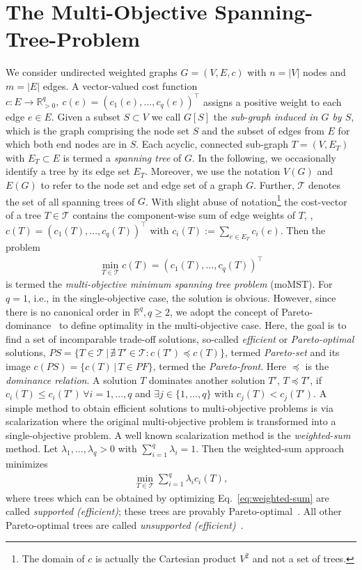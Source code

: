\documentclass[twoside]{article}
\begin{document}
\section{The Multi-Objective Spanning-Tree-Problem}
\label{sec:problem}
%
We consider undirected weighted graphs $G = (V, E, c)$ with $n = |V|$ nodes and $m = |E|$ edges. A vector-valued cost function $c : E \to \mathbb{R}^q_{>0}, \ c(e) = (c_1(e), \ldots, c_q(e))^{\top}$ assigns a positive weight to each edge $e \in E$. Given a subset $S \subset V$ we call $G[S]$ the \emph{sub-graph induced in $G$ by $S$}, which is the graph comprising the node set $S$ and the subset of edges from $E$ for which both end nodes are in $S$.
Each acyclic, connected sub-graph $T = (V, E_T)$ with $E_T \subset E$ is termed a \emph{spanning tree} of $G$. In the following, we occasionally identify a tree by its edge set $E_T$. Moreover, we use the notation $V(G)$ and $E(G)$ to refer to the node set and edge set of a graph $G$.
Further, $\mathcal{T}$ denotes the set of all spanning trees of $G$. With slight abuse of notation\footnote{The domain of $c$ is actually the Cartesian product $V^2$ and not a set of trees.} the cost-vector of a tree $T \in \mathcal{T}$ contains the component-wise sum of edge weights of $T$, \ie, $c(T) = (c_1(T), \ldots, c_q(T))^{\top}$ with $c_i(T) := \sum_{e \in E_T} c_i(e)$. Then the problem
\begin{align*}
  \min_{T \in \mathcal{T}} c(T) = (c_1(T), \ldots, c_q(T))^{\top}
\end{align*}
is termed the \emph{multi-objective minimum spanning tree problem} (moMST). For $q = 1$, i.e., in the single-objective case, the solution is obvious. However, since there is no canonical order in $\mathbb{R}^q, q \geq 2$, we adopt the concept of Pareto-dominance~\citep{CCC2007,miettinen1999nonlinear} to define optimality in the multi-objective case. Here, the goal is to find a set of incomparable trade-off solutions, so-called \emph{efficient} or \emph{Pareto-optimal} solutions, $PS = \{T \in \mathcal{T} \, | \, \nexists\ T' \in \mathcal{T}: c(T') \preceq c(T)\}$, termed \emph{Pareto-set} and its image $c(PS) = \{c(T) \, | \, T \in PF\}$, termed the \emph{Pareto-front}. Here $\preceq$ is the \emph{dominance relation}. A solution $T$ dominates another solution $T'$, $T \preceq T'$, if $c_i(T) \leq c_i(T') \,\forall i = 1,\ldots,q$ and $\exists j \in \{1, \ldots, q\}$ with $c_j(T) < c_j(T')$.
A simple method to obtain efficient solutions to multi-objective problems is via scalarization where the original multi-objective problem is transformed into a single-objective problem. A well known scalarization method is the \emph{weighted-sum} method. Let $\lambda_1, \ldots, \lambda_q > 0$ with $\sum_{i=1}^{q} \lambda_i = 1$. Then the weighted-sum approach minimizes
\begin{align}
    \min_{T \in \mathcal{T}} \sum_{i=1}^{q} \lambda_i c_i(T),\label{eq:weighted-sum}
\end{align}
where trees which can be obtained by optimizing Eq.~\eqref{eq:weighted-sum} are called \emph{supported (efficient)}; these trees are provably Pareto-optimal~\cite[p.~71]{Ehrgott2005}.
All other Pareto-optimal trees are called \emph{unsupported (efficient)}~\citep{RH09}.
\end{document}
